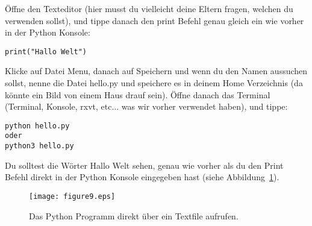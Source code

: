 \begin{LINUX}
Öffne den Texteditor (hier musst du vielleicht deine Eltern fragen, welchen du verwenden sollst), und tippe danach den print Befehl genau gleich ein wie vorher in der Python Konsole:

\begin{listing}
\begin{verbatim}
print("Hallo Welt")
\end{verbatim}
\end{listing}

Klicke auf Datei Menu, danach auf Speichern und wenn du den Namen aussuchen sollst, nenne die Datei hello.py und speichere es in deinem Home Verzeichnis (da könnte ein Bild von einem Haus drauf sein). Öffne danach das Terminal (Terminal, Konsole, rxvt, etc... was wir vorher verwendet haben), und tippe:

\begin{listing}
\begin{verbatim}
python hello.py
oder
python3 hello.py
\end{verbatim}
\end{listing}

Du solltest die Wörter Hallo Welt sehen, genau wie vorher als du den Print Befehl direkt in der Python Konsole eingegeben hast (siehe Abbildung~\ref{fig9}).

\begin{figure}
\begin{center}
\texttt{[image: figure9.eps]}
\end{center}
\caption{Das Python Programm direkt über ein Textfile aufrufen.}\label{fig9}
\end{figure}
\end{LINUX}

